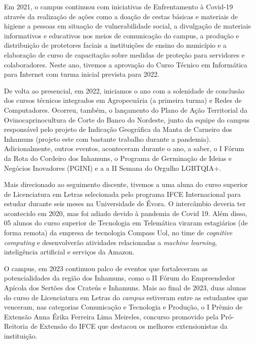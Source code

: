 Em 2021, o campus continuou com iniciativas de Enfrentamento à Covid-19 através
da realização de ações como a doação de cestas básicas e materiais de higiene a
pessoas em situação de vulnerabilidade social, a divulgação de materiais
informativos e educativos nos meios de comunicação do campus, a produção e
distribuição de protetores faciais a instituições de ensino do município e a
elaboração de curso de capacitação sobre medidas de proteção para servidores e
colaboradores. Neste ano, tivemos a aprovação do Curso Técnico em Informática
para Internet com turma inicial prevista para 2022.

De volta ao presencial, em 2022, iniciamos o ano com a solenidade de conclusão
dos cursos técnicos integrados em Agropecuária (a primeira turma) e Redes de
Computadores. Ocorreu, também, o lançamento do Plano de Ação Territorial da
Ovinocaprinocultura de Corte do Banco do Nordeste, junto da   equipe do campus
responsável pelo projeto de Indicação Geográfica da Manta de Carneiro dos
Inhamuns (projeto este com bastante trabalho durante a pandemia).
Adicionalmente, outros eventos, aconteceram durante o ano, a saber, o I Fórum da
Rota do Cordeiro dos Inhamuns, o Programa de Germinação de Ideias e Negócios
Inovadores (PGINI) e a a II Semana do Orgulho LGBTQIA+.

Mais direcionado ao seguimento discente, tivemos a uma aluna do curso superior
de Licenciatura em Letras  selecionada pelo programa IFCE Internacional para
estudar durante seis meses na Universidade de Évora. O intercâmbio deveria ter
acontecido em 2020, mas foi adiado devido à pandemia de Covid 19. Além disso, 05 alunos 
do curso superior de Tecnologia em
Telemática viraram estagiários (de forma remota) da empresa de tecnologia Compass Uol,  no time de \textit{cognitive computing} e desenvolverão atividades
relacionadas a \textit{machine learning}, inteligência artificial e serviços da Amazon.



O campus, em 2023 continuou palco de eventos que fortaleceram as potencialidades da
região dos Inhamuns, como o II Fórum do Empreendedor Apícola dos Sertões dos
Crateús e Inhamuns. Mais ao final de 2023, duas alunas do curso de Licenciatura em Letras do
\textit{campus}   estiveram entre as estudantes que venceram, nas categorias Comunicação e Tecnologia e Produção, o I Prêmio de
Extensão Anna Érika Ferreira Lima Meireles, concurso promovido pela
Pró-Reitoria de Extensão do IFCE que destacou os melhores
extensionistas da instituição.


